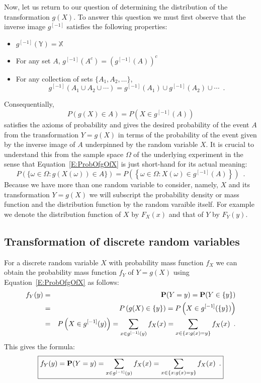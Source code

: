 Now, let us return to our question of determining the distribution of the transformation $g(X)$.  To answer this question we must first observe that the inverse image $g^{[-1]}$ satisfies the following properties:
\begin{itemize}
\item $g^{[-1]}(\mathbb{Y}) = \mathbb{X}$
\item For any set $A$, $g^{[-1]}(A^c) = \left(g^{[-1]}(A)\right)^c$
\item For any collection of sets $\{A_1,A_2,\ldots\}$,
\[
g^{[-1]}\left( A_1 \cup A_2 \cup \cdots \right) = g^{[-1]}(A_1) \cup g^{[-1]}(A_2) \cup \cdots \enspace.
\]
\end{itemize}
Consequentially, 
\begin{equation}\label{E:ProbOfgOfX}
\boxed{P \left( g(X) \in A \right) = P \left(X \in g^{[-1]}(A) \right)}
\end{equation} 
satisfies the axioms of probability and gives the desired probability of the event $A$ from the transformation $Y=g(X)$ in terms of the probability of the event given by the inverse image of $A$ underpinned by the random variable $X$.  
It is crucial to understand this from the sample space $\Omega$ of the underlying experiment in the sense that Equation~\eqref{E:ProbOfgOfX} is just short-hand for its actual meaning:
\[
P \left( \{\omega \in \Omega: g(X(\omega)) \in A\} \right) 
= P \left( \left\{ \omega \in \Omega: X(\omega) \in g^{[-1]}(A) \right\} \right) \enspace .
\]
Because we have more than one random variable to consider, namely, $X$ and its transformation $Y=g(X)$ we will subscript the probability density or mass function and the distribution function by the random varaible itself.  For example we denote the distribution function of $X$ by $F_X(x)$ and that of $Y$ by $F_Y(y)$.

\subsection{Transformation of discrete random variables}
For a discrete random variable $X$ with probability mass function $f_X$ we can obtain the probability mass function $f_Y$ of $Y=g(X)$ using Equation~\eqref{E:ProbOfgOfX} as follows:
\begin{eqnarray*}
f_Y(y) 
&=& \mathbf{P}(Y =y) = \mathbf{P}(Y \in \{y\}) \\
&=& P \left( g(X) \in \{y\} \right) = P \left(X \in g^{[-1]}(\{y\}) \right)\\
&=& P \left(X \in g^{[-1]}(y) \right) = \sum_{x \in g^{[-1]}(y)} f_X(x) = \sum_{x \in \{x: g(x)=y\}} f_X(x) \enspace .
\end{eqnarray*}
This gives the formula:
\begin{equation}\label{E:PMFOfgOfX}
\boxed{
f_Y(y) = \mathbf{P}(Y =y) = \sum_{x \in g^{[-1]}(y)} f_X(x) = \sum_{x \in \{x: g(x)=y\}} f_X(x) \enspace .
}
\end{equation}

